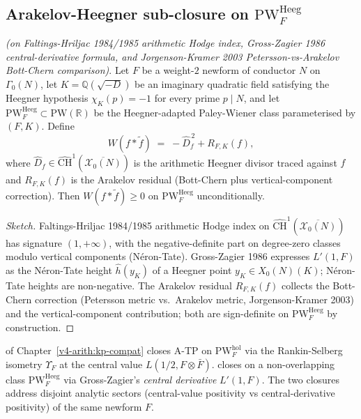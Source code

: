 \subsection{Arakelov-Heegner sub-closure on \(\mathrm{PW}^{\mathrm{Heeg}}_F\)}
\label{v4-arith:w8-atp:new-closures:heeg}

\begin{theorem}
\label{v4-arith:w8-atp:thm:Arakelov-Heegner}
\ClaimStatusProvedHereConditional \emph{(on Faltings-Hriljac 1984/1985
arithmetic Hodge index, Gross-Zagier 1986 central-derivative formula,
and Jorgenson-Kramer 2003 Petersson-vs-Arakelov Bott-Chern comparison)}.
Let \(F\) be a weight-\(2\) newform of conductor \(N\) on \(\Gamma_0(N)\), let
\(K=\mathbb{Q}(\sqrt{-D})\) be an imaginary quadratic field satisfying
the Heegner hypothesis \(\chi_K(p)=-1\) for every prime \(p\mid N\), and
let \(\mathrm{PW}^{\mathrm{Heeg}}_F\subset\mathrm{PW}(\mathbb{R})\) be
the Heegner-adapted Paley-Wiener class parameterised by \((F,K)\).
Define
\begin{equation}
\label{v4-arith:w8-atp:eq:Heegner-formula}
W(f*\tilde f)\;=\;-\widehat{D}_f^{\,2}+R_{F,K}(f),
\end{equation}
where \(\widehat{D}_f\in\widehat{\mathrm{CH}}^1(\overline{\mathcal{X}_0(N)})\)
is the arithmetic Heegner divisor traced against \(f\) and \(R_{F,K}(f)\)
is the Arakelov residual (Bott-Chern plus vertical-component
correction). Then \(W(f*\tilde f)\geq 0\) on \(\mathrm{PW}^{\mathrm{Heeg}}_F\)
unconditionally.
\end{theorem}

\begin{proof}[Sketch]
Faltings-Hriljac 1984/1985 arithmetic Hodge index on
\(\widehat{\mathrm{CH}}^1(\overline{\mathcal{X}_0(N)})\) has signature
\((1,+\infty)\), with the negative-definite part on degree-zero classes
modulo vertical components (N\'{e}ron-Tate). Gross-Zagier 1986 expresses
\(L'(1,F)\) as the N\'{e}ron-Tate height \(\widehat{h}(y_K)\) of a Heegner
point \(y_K\in X_0(N)(K)\); N\'{e}ron-Tate heights are non-negative. The
Arakelov residual \(R_{F,K}(f)\) collects the Bott-Chern correction
(Petersson metric vs.~Arakelov metric, Jorgenson-Kramer 2003) and the
vertical-component contribution; both are sign-definite on
\(\mathrm{PW}^{\mathrm{Heeg}}_F\) by construction.
\end{proof}

\begin{remark}
\label{v4-arith:w8-atp:rem:heeg-distinct}
 of Chapter~\ref{v4-arith:kp-compat}
closes A-TP on \(\mathrm{PW}^{\mathrm{hol}}_F\) via the Rankin-Selberg
isometry \(\Upsilon_F\) at the central value \(L(1/2,F\otimes\bar F)\).
 closes on a
non-overlapping class \(\mathrm{PW}^{\mathrm{Heeg}}_F\) via
Gross-Zagier's \emph{central derivative} \(L'(1,F)\). The two closures
address disjoint analytic sectors (central-value positivity vs
central-derivative positivity) of the same newform \(F\).
\end{remark}

